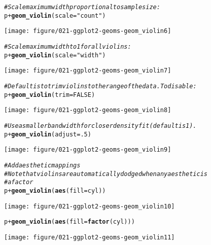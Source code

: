 \documentclass[a4paper,titlepage]{tufte-handout}\usepackage[]{graphicx}\usepackage[]{color}
\makeatletter
\def\maxwidth{ %
  \ifdim\Gin@nat@width>\linewidth
    \linewidth
  \else
    \Gin@nat@width
  \fi
}
\newcommand{\hlnum}[1]{\textcolor[rgb]{0.686,0.059,0.569}{#1}}%
\newcommand{\hlstr}[1]{\textcolor[rgb]{0.192,0.494,0.8}{#1}}%
\newcommand{\hlcom}[1]{\textcolor[rgb]{0.678,0.584,0.686}{\textit{#1}}}%
\newcommand{\hlopt}[1]{\textcolor[rgb]{0,0,0}{#1}}%
\newcommand{\hlstd}[1]{\textcolor[rgb]{0.345,0.345,0.345}{#1}}%
\newcommand{\hlkwc}[1]{\textcolor[rgb]{0.333,0.667,0.333}{#1}}%
\newcommand{\hlkwd}[1]{\textcolor[rgb]{0.737,0.353,0.396}{\textbf{#1}}}%
\newenvironment{kframe}{%
 \def\at@end@of@kframe{}%
 \ifinner\ifhmode%
  \def\at@end@of@kframe{\end{minipage}}%
  \begin{minipage}{\columnwidth}%
 \fi\fi%
 \def\FrameCommand##1{\hskip\@totalleftmargin \hskip-\fboxsep
 \colorbox{shadecolor}{##1}\hskip-\fboxsep
     \hskip-\linewidth \hskip-\@totalleftmargin \hskip\columnwidth}%
 \MakeFramed {\advance\hsize-\width
   \@totalleftmargin\z@ \linewidth\hsize
   \@setminipage}}%
 {\par\unskip\endMakeFramed%
 \at@end@of@kframe}
\newenvironment{knitrout}{}{} %
\makeatother
\begin{document}
\begin{knitrout}
\begin{kframe}
\begin{alltt}
\hlcom{# Scale maximum width proportional to sample size:}
\hlstd{p} \hlopt{+} \hlkwd{geom_violin}\hlstd{(}\hlkwc{scale} \hlstd{=} \hlstr{"count"}\hlstd{)}
\end{alltt}
\end{kframe}
\texttt{[image: figure/021-ggplot2-geoms-geom\_violin6]} 
\begin{kframe}\begin{alltt}
\hlcom{# Scale maximum width to 1 for all violins:}
\hlstd{p} \hlopt{+} \hlkwd{geom_violin}\hlstd{(}\hlkwc{scale} \hlstd{=} \hlstr{"width"}\hlstd{)}
\end{alltt}
\end{kframe}
\texttt{[image: figure/021-ggplot2-geoms-geom\_violin7]} 
\begin{kframe}\begin{alltt}
\hlcom{# Default is to trim violins to the range of the data. To disable:}
\hlstd{p} \hlopt{+} \hlkwd{geom_violin}\hlstd{(}\hlkwc{trim} \hlstd{=} \hlnum{FALSE}\hlstd{)}
\end{alltt}
\end{kframe}
\texttt{[image: figure/021-ggplot2-geoms-geom\_violin8]} 
\begin{kframe}\begin{alltt}
\hlcom{# Use a smaller bandwidth for closer density fit (default is 1).}
\hlstd{p} \hlopt{+} \hlkwd{geom_violin}\hlstd{(}\hlkwc{adjust} \hlstd{=} \hlnum{.5}\hlstd{)}
\end{alltt}
\end{kframe}
\texttt{[image: figure/021-ggplot2-geoms-geom\_violin9]} 
\begin{kframe}\begin{alltt}
\hlcom{# Add aesthetic mappings}
\hlcom{# Note that violins are automatically dodged when any aesthetic is}
\hlcom{# a factor}
\hlstd{p} \hlopt{+} \hlkwd{geom_violin}\hlstd{(}\hlkwd{aes}\hlstd{(}\hlkwc{fill} \hlstd{= cyl))}
\end{alltt}
\end{kframe}
\texttt{[image: figure/021-ggplot2-geoms-geom\_violin10]} 
\begin{kframe}\begin{alltt}
\hlstd{p} \hlopt{+} \hlkwd{geom_violin}\hlstd{(}\hlkwd{aes}\hlstd{(}\hlkwc{fill} \hlstd{=} \hlkwd{factor}\hlstd{(cyl)))}
\end{alltt}
\end{kframe}
\texttt{[image: figure/021-ggplot2-geoms-geom\_violin11]} 

\end{knitrout}
\end{document}
